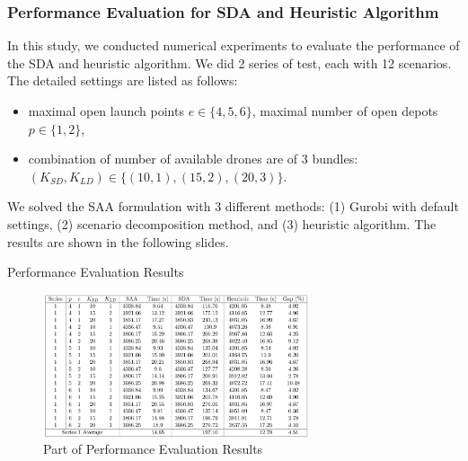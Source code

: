 \documentclass[aspectratio=169]{beamer}
\begin{document}
\begin{frame}\frametitle{Performance Evaluation for SDA and Heuristic Algorithm}
In this study, we conducted numerical experiments to evaluate the performance of the SDA and heuristic algorithm. We did 2 series of test, each with 12 scenarios. The detailed settings are listed as follows:
    \begin{itemize}[label=$\star$]
        \item maximal open launch points $e \in \{ 4, 5, 6\}$, maximal number of open depots $p \in \{1,2\}$,
        \item combination of number of available drones are of 3 bundles: $(K_{SD},K_{LD}) \in \{(10,1),(15,2),(20,3)\}$.
    \end{itemize}
\vspace{1em}
We solved the SAA formulation with 3 different methods: (1) Gurobi with default settings, (2) scenario decomposition method, and (3) heuristic algorithm. The results are shown in the following slides.
\end{frame}

\begin{frame}{Performance Evaluation Results}
\begin{figure}
    \centering
    \includegraphics[width=0.7\textwidth]{fig_performance_evaluation.png}
    \caption{Part of Performance Evaluation Results}
    \label{fig:pe_result}
\end{figure}
    
\end{frame}
\end{document}
